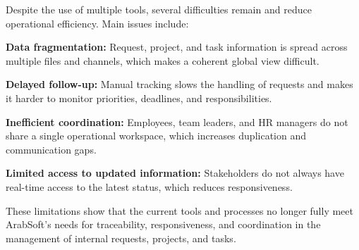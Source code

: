 {\fontsize{12}{18}\selectfont
\setlength{\parindent}{1.2cm}
\setlength{\parskip}{6pt}

\indent Despite the use of multiple tools, several difficulties remain and reduce operational efficiency. Main issues include:

\begin{itemize}[leftmargin=2cm, itemsep=4pt]
  {\fontsize{12}{18}\selectfont
  \item \textbf{Data fragmentation:} Request, project, and task information is spread across multiple files and channels, which makes a coherent global view difficult.
  \item \textbf{Delayed follow-up:} Manual tracking slows the handling of requests and makes it harder to monitor priorities, deadlines, and responsibilities.
  \item \textbf{Inefficient coordination:} Employees, team leaders, and HR managers do not share a single operational workspace, which increases duplication and communication gaps.
  \item \textbf{Limited access to updated information:} Stakeholders do not always have real-time access to the latest status, which reduces responsiveness.
  }
\end{itemize}

\indent These limitations show that the current tools and processes no longer fully meet ArabSoft's needs for traceability, responsiveness, and coordination in the management of internal requests, projects, and tasks.

}

\vspace{6pt}


